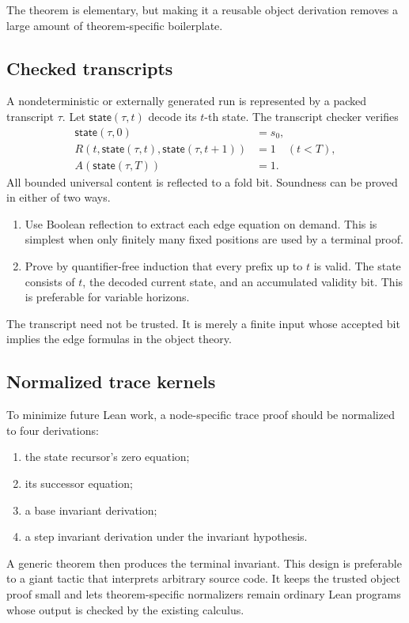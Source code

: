 The theorem is elementary, but making it a reusable object derivation removes a large amount of theorem-specific boilerplate.

\subsection{Checked transcripts}

A nondeterministic or externally generated run is represented by a packed transcript \(\tau\).  Let \(\mathsf{state}(\tau,t)\) decode its \(t\)-th state.  The transcript checker verifies
\begin{align*}
  \mathsf{state}(\tau,0)&=s_0,\\
  R(t,\mathsf{state}(\tau,t),\mathsf{state}(\tau,t+1))&=1
  \quad(t<T),\\
  A(\mathsf{state}(\tau,T))&=1.
\end{align*}
All bounded universal content is reflected to a fold bit.  Soundness can be proved in either of two ways.

\begin{enumerate}[label=(\alph*),leftmargin=2.3em]
\item Use Boolean reflection to extract each edge equation on demand.  This is simplest when only finitely many fixed positions are used by a terminal proof.
\item Prove by quantifier-free induction that every prefix up to \(t\) is valid.  The state consists of \(t\), the decoded current state, and an accumulated validity bit.  This is preferable for variable horizons.
\end{enumerate}

The transcript need not be trusted.  It is merely a finite input whose accepted bit implies the edge formulas in the object theory.

\subsection{Normalized trace kernels}

To minimize future Lean work, a node-specific trace proof should be normalized to four derivations:
\begin{enumerate}[label=(\roman*),leftmargin=2.3em]
\item the state recursor's zero equation;
\item its successor equation;
\item a base invariant derivation;
\item a step invariant derivation under the invariant hypothesis.
\end{enumerate}
A generic theorem then produces the terminal invariant.  This design is preferable to a giant tactic that interprets arbitrary source code.  It keeps the trusted object proof small and lets theorem-specific normalizers remain ordinary Lean programs whose output is checked by the existing calculus.

